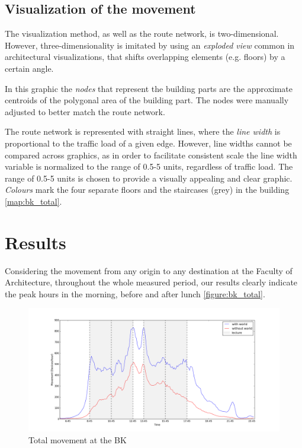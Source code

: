 
\subsection{Visualization of the movement}
The visualization method, as well as the route network, is two-dimensional.
However, three-dimensionality is imitated by using an \textit{exploded view}
common in architectural visualizations, that shifts overlapping elements (e.g.
floors) by a certain angle.

In this graphic the \textit{nodes} that represent the building parts are the 
approximate centroids of the polygonal area of the building part. The nodes were 
manually adjusted
to better match the route network.

The route network is represented with
straight lines, where the \textit{line width} is proportional to the traffic
load of a given edge. However, line widths cannot be compared across graphics, as in order
to facilitate consistent scale the line width variable is normalized to
the range of 0.5-5 units, regardless of traffic load. The range of 0.5-5 units
is chosen to provide a visually appealing and clear graphic. \textit{Colours}
mark the four separate floors and the staircases (grey) in the building
\autoref{map:bk_total}.

\section{Results}
Considering the movement from any origin to any destination at the Faculty of
Architecture, throughout the whole measured period, our results clearly indicate
the peak hours in the morning, before and after lunch \autoref{figure:bk_total}.

\begin{figure}[H]
\centering
\includegraphics[scale=0.35]{buildingpart_all_graph.png}
\captionsetup{justification=centering}
\caption{Total movement at the BK}
\label{figure:bk_total}
\end{figure}

